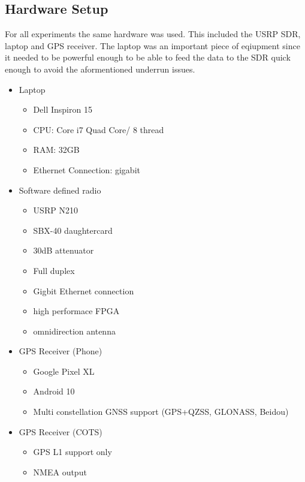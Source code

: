 \subsection{Hardware Setup}
For all experiments the same hardware was used. This included the USRP SDR, laptop and GPS receiver. The laptop was an important piece of eqiupment since it needed to be
powerful enough to be able to feed the data to the SDR quick enough to avoid the aformentioned underrun issues.

\begin{itemize}
    \item Laptop
    \begin{itemize}
        \item Dell Inspiron 15
        \item CPU: Core i7 Quad Core/ 8 thread
        \item RAM: 32GB
        \item Ethernet Connection: gigabit
    \end{itemize}
    \item Software defined radio
    \begin{itemize}
        \item USRP N210
        \item SBX-40 daughtercard
        \item 30dB attenuator
        \item Full duplex
        \item Gigbit Ethernet connection
        \item high performace FPGA
        \item omnidirection antenna
    \end{itemize}
    \item GPS Receiver (Phone)
    \begin{itemize}
        \item Google Pixel XL
        \item Android 10
        \item Multi constellation GNSS support (GPS+QZSS, GLONASS, Beidou)
    \end{itemize}
    \item GPS Receiver (COTS)
    \begin{itemize}
        \item GPS L1 support only
        \item NMEA output
    \end{itemize}
\end{itemize}

